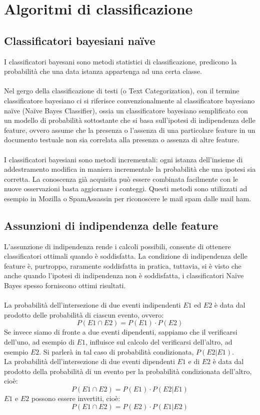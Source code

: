 \documentclass{article}
\theoremstyle{plain}
\theoremstyle{definition}
\begin{document}
\newpage
\section{Algoritmi di classificazione}

\subsection{Classificatori bayesiani naïve}
I classificatori bayesani sono metodi statistici di classificazione, predicono la probabilità che una data istanza appartenga ad una certa classe.
\\
\\
Nel gergo della classificazione di testi (o Text Categorization), con il termine classificatore bayesiano ci si riferisce convenzionalmente al classificatore bayesiano naïve (Naïve Bayes Classifier), ossia un classificatore bayesiano semplificato con un modello di probabilità sottostante che si basa sull'ipotesi di indipendenza delle feature, ovvero assume che la presenza o l'assenza di una particolare feature in un documento testuale non sia correlata alla presenza o assenza di altre feature.
\\
\\
I classificatori bayesiani sono metodi incrementali: ogni istanza dell'insieme di addestramento modifica in maniera incrementale la probabilità che una ipotesi sia corretta.
La conoscenza già acquisita può essere combinata facilmente con le nuove osservazioni basta aggiornare i conteggi. Questi metodi sono utilizzati ad esempio in Mozilla o SpamAssassin per riconoscere le mail spam dalle mail ham.
\subsection{Assunzioni di indipendenza delle feature}
L'assunzione di indipendenza rende i calcoli possibili, consente di ottenere classificatori ottimali quando è soddisfatta. La condizione di indipendenza delle feature è, purtroppo, raramente soddisfatta in pratica, tuttavia, si è visto che anche quando l'ipotesi di indipendenza non è soddisfatta, i classificatori Naïve Bayes spesso forniscono ottimi risultati.
\\
\\
La probabilità dell'intersezione di due eventi indipendenti $E1$ ed $E2$ è data dal prodotto delle probabilità di ciascun evento, ovvero:
$$ P(E1 \cap E2) = P(E1) \cdot P(E2)$$
Se invece siamo di fronte a due eventi dipendenti, sappiamo che il verificarsi dell'uno, ad esempio di $E1$, influisce sul calcolo del verificarsi dell'altro, ad esempio $E2$. Si parlerà in tal caso di probabilità condizionata, $P(E2|E1)$.
\\
La probabilità dell'intersezione di due eventi dipendenti $E1$ e di $E2$ è data dal prodotto della probabilità di un evento per la probabilità condizionata dell'altro, cioè: 
$$ P(E1 \cap E2) = P(E1) \cdot P(E2|E1)$$
$E1$ e $E2$ possono essere invertiti, cioè:
$$ P(E1 \cap E2) = P(E2) \cdot P(E1|E2)$$
\end{document}
